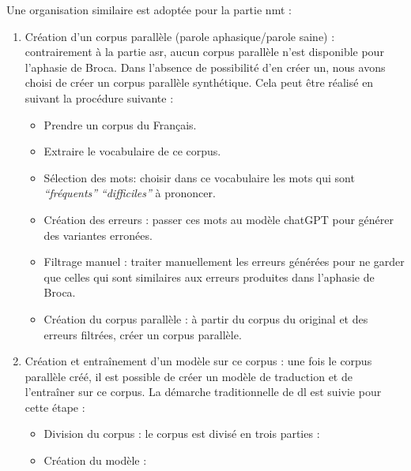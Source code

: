 Une organisation similaire est adoptée pour la partie \gls{nmt} :
\begin{enumerate}[label=(\roman*)]
    \item Création d'un corpus parallèle (parole aphasique/parole saine) :
    contrairement à la partie \gls{asr}, aucun corpus parallèle n'est disponible pour l'aphasie de Broca.
    Dans l'absence de possibilité d'en créer un, nous avons choisi de créer un corpus parallèle synthétique.
    Cela peut être réalisé en suivant la procédure suivante :
    \begin{itemize}
        \item Prendre un corpus du Français.
        \item Extraire le vocabulaire de ce corpus.
        \item Sélection des mots: 
        choisir dans ce vocabulaire les mots qui sont \emph{``fréquents''} \emph{``difficiles''} à prononcer.
        \item Création des erreurs :
        passer ces mots au modèle chatGPT pour générer des variantes erronées.
        \item Filtrage manuel :
        traiter manuellement les erreurs générées pour ne garder que celles qui sont similaires aux erreurs produites dans l'aphasie de Broca.
        \item Création du corpus parallèle :
        à partir du corpus du original et des erreurs filtrées, créer un corpus parallèle.
    \end{itemize}
    \item Création et entraînement d'un modèle sur ce corpus :
    une fois le corpus parallèle créé, 
    il est possible de créer un modèle de traduction et de l'entraîner sur ce corpus.
    La démarche traditionnelle de \gls{dl} est suivie pour cette étape :
    \begin{itemize}
        \item Division du corpus :
        le corpus est divisé en trois parties :
        \item Création du modèle :

\end{itemize}
\end{enumerate}
